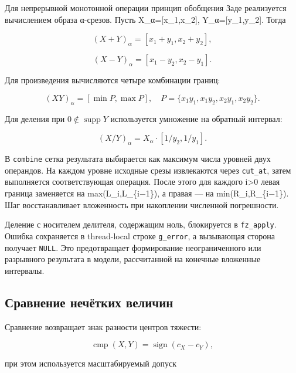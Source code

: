Для непрерывной монотонной операции принцип обобщения Заде реализуется вычислением образа α-срезов. Пусть X\_α=[x\_1,x\_2], Y\_α=[y\_1,y\_2]. Тогда

\begin{equation}
(X+Y)_\alpha=[x_1+y_1,x_2+y_2],
\end{equation}

\begin{equation}
(X-Y)_\alpha=[x_1-y_2,x_2-y_1].
\end{equation}

Для произведения вычисляются четыре комбинации границ:

\begin{equation}
(XY)_\alpha=[\min P,\max P], \quad P=\{x_1y_1,x_1y_2,x_2y_1,x_2y_2\}.
\end{equation}

Для деления при $0\notin\operatorname{supp}Y$ используется умножение на обратный интервал:

\begin{equation}
(X/Y)_\alpha=X_\alpha\cdot[1/y_2,1/y_1].
\end{equation}

В \texttt{combine} сетка результата выбирается как максимум числа уровней двух операндов. На каждом уровне исходные срезы извлекаются через \texttt{cut\_at}, затем выполняется соответствующая операция. После этого для каждого i>0 левая граница заменяется на max(L\_i,L\_\{i−1\}), а правая — на min(R\_i,R\_\{i−1\}). Шаг восстанавливает вложенность при накоплении численной погрешности.

Деление с носителем делителя, содержащим ноль, блокируется в \texttt{fz\_apply}. Ошибка сохраняется в thread-local строке \texttt{g\_error}, а вызывающая сторона получает \texttt{NULL}. Это предотвращает формирование неограниченного или разрывного результата в модели, рассчитанной на конечные вложенные интервалы.

\subsection{Сравнение нечётких величин}

Сравнение возвращает знак разности центров тяжести:

\begin{equation}
\operatorname{cmp}(X,Y)=\operatorname{sign}(c_X-c_Y),
\end{equation}

при этом используется масштабируемый допуск

